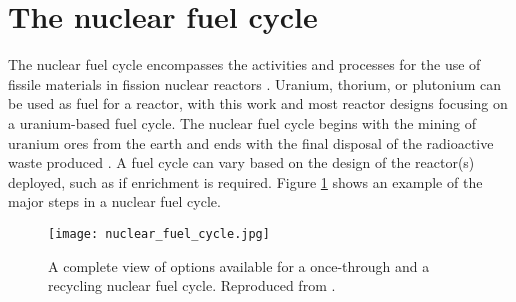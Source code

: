 %
%
%
\section{The nuclear fuel cycle}
The nuclear fuel cycle encompasses the activities and processes 
for the use of fissile materials in fission nuclear reactors 
\cite{tsoulfanidis_nuclear_2013}. 
Uranium, thorium, or plutonium can be used as 
fuel for a reactor, with this work and most reactor designs focusing on 
a uranium-based 
fuel cycle. The nuclear fuel cycle begins with the mining of uranium ores 
from the earth and ends with the final disposal of the radioactive 
waste produced 
\cite{tsoulfanidis_nuclear_2013}. A fuel cycle can vary based on the
design of the reactor(s) deployed, such as if enrichment is required.  
Figure \ref{fig:fuel_cycle} shows 
an example of the major steps in a nuclear fuel cycle. 

\begin{figure}
    \centering
    \texttt{[image: nuclear\_fuel\_cycle.jpg]}
    \caption{A complete view of options available for a once-through and 
    a recycling nuclear fuel cycle. Reproduced from 
    \protect\cite{us_nuclear_regulatory_commission_stages_2020}.}
    \label{fig:fuel_cycle}
\end{figure}


